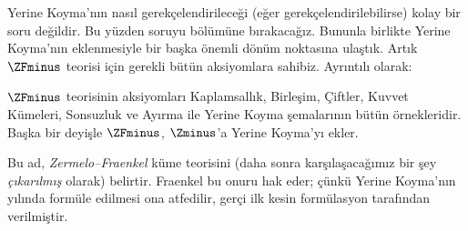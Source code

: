 

Yerine Koyma'nın nasıl gerekçelendirileceği (eğer gerekçelendirilebilirse)
kolay bir soru değildir. Bu yüzden soruyu 
bölümüne bırakacağız. Bununla birlikte Yerine Koyma'nın eklenmesiyle bir
başka önemli dönüm noktasına ulaştık. Artık $\ZFminus$ teorisi için gerekli
bütün aksiyomlara sahibiz. Ayrıntılı olarak:

\begin{defn}
$\ZFminus$ teorisinin aksiyomları Kaplamsallık, Birleşim, Çiftler, Kuvvet
Kümeleri, Sonsuzluk ve Ayırma ile Yerine Koyma şemalarının bütün
örnekleridir. Başka bir deyişle $\ZFminus$, $\Zminus$'a Yerine Koyma'yı
ekler.
\end{defn}
\noindent
Bu ad, \emph{Zermelo--Fraenkel} küme teorisini (daha sonra karşılaşacağımız
bir şey \emph{çıkarılmış} olarak) belirtir. Fraenkel bu onuru hak eder;
çünkü Yerine Koyma'nın \citeyear{Fraenkel1922} yılında formüle edilmesi ona
atfedilir, gerçi ilk kesin formülasyon \citet{Skolem1922} tarafından
verilmiştir.

